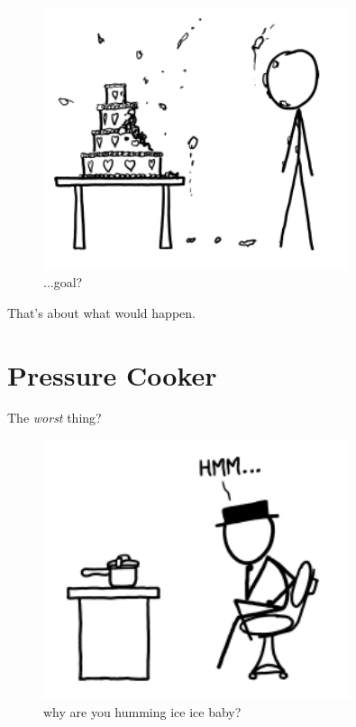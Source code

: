 \begin{figure}[!htbp]
\centering
\includegraphics[scale=0.5, max width=0.8\textwidth]{imgs/a/39/goalie_cake.png}
\caption{...goal?}
\end{figure}

{That’s about what would happen.}

{
\chapter{Pressure Cooker}
}

\hfill{}

{The \emph{worst} thing?}

\begin{figure}[!htbp]
\centering
\includegraphics[scale=0.5, max width=0.8\textwidth]{imgs/a/40/pressure_cooker_hmm.png}
\caption{why are you humming ice ice baby?}
\end{figure}

